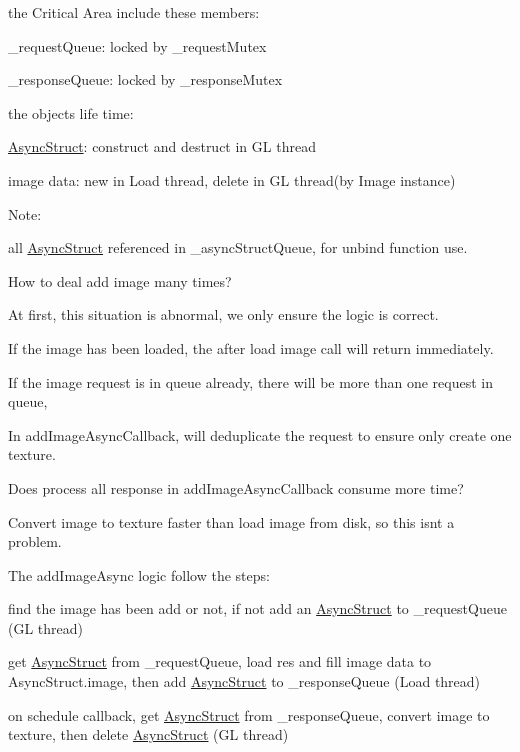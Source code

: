 the Critical Area include these members\+:
\begin{DoxyItemize}
\item \+\_\+request\+Queue\+: locked by \+\_\+request\+Mutex
\item \+\_\+response\+Queue\+: locked by \+\_\+response\+Mutex
\end{DoxyItemize}

the object\textquotesingle{}s life time\+:
\begin{DoxyItemize}
\item \hyperlink{structTextureCache_1_1AsyncStruct}{Async\+Struct}\+: construct and destruct in GL thread
\item image data\+: new in Load thread, delete in GL thread(by Image instance)
\end{DoxyItemize}

Note\+:
\begin{DoxyItemize}
\item all \hyperlink{structTextureCache_1_1AsyncStruct}{Async\+Struct} referenced in \+\_\+async\+Struct\+Queue, for unbind function use.
\end{DoxyItemize}

How to deal add image many times?
\begin{DoxyItemize}
\item At first, this situation is abnormal, we only ensure the logic is correct.
\item If the image has been loaded, the after load image call will return immediately.
\item If the image request is in queue already, there will be more than one request in queue,
\item In add\+Image\+Async\+Callback, will deduplicate the request to ensure only create one texture.
\end{DoxyItemize}

Does process all response in add\+Image\+Async\+Callback consume more time?
\begin{DoxyItemize}
\item Convert image to texture faster than load image from disk, so this isn\textquotesingle{}t a problem.
\end{DoxyItemize}

The add\+Image\+Async logic follow the steps\+:
\begin{DoxyItemize}
\item find the image has been add or not, if not add an \hyperlink{structTextureCache_1_1AsyncStruct}{Async\+Struct} to \+\_\+request\+Queue (GL thread)
\item get \hyperlink{structTextureCache_1_1AsyncStruct}{Async\+Struct} from \+\_\+request\+Queue, load res and fill image data to Async\+Struct.\+image, then add \hyperlink{structTextureCache_1_1AsyncStruct}{Async\+Struct} to \+\_\+response\+Queue (Load thread)
\item on schedule callback, get \hyperlink{structTextureCache_1_1AsyncStruct}{Async\+Struct} from \+\_\+response\+Queue, convert image to texture, then delete \hyperlink{structTextureCache_1_1AsyncStruct}{Async\+Struct} (GL thread)
\end{DoxyItemize}

